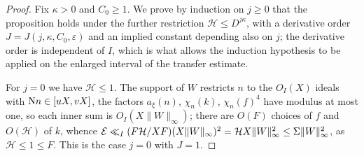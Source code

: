\begin{proof}
Fix $\kappa>0$ and $C_0\ge1$. We prove by induction on $j\ge0$ that the proposition holds under the further restriction $\mathcal H\le D^{j\kappa}$, with a derivative order $J=J(j,\kappa,C_0,\varepsilon)$ and an implied constant depending also on $j$; the derivative order is independent of $I$, which is what allows the induction hypothesis to be applied on the enlarged interval of the transfer estimate.

For $j=0$ we have $\mathcal H\le1$. The support of $W$ restricts $n$ to the $O_I(X)$ ideals with $\mathrm{N} n\in[uX,vX]$, the factors $a_\xi(n)$, $\chi_n(k)$, $\chi_n(f)^4$ have modulus at most one, so each inner sum is $O_I(X\|W\|_\infty)$; there are $O(F)$ choices of $f$ and $O(\mathcal H)$ of $k$, whence $\mathcal{E}\ll_I(F\mathcal H/XF)(X\|W\|_\infty)^2=\mathcal HX\|W\|_\infty^2\le\Sigma\|W\|_\infty^2$, as $\mathcal H\le1\le F$. This is the case $j=0$ with $J=1$.


\end{proof}
